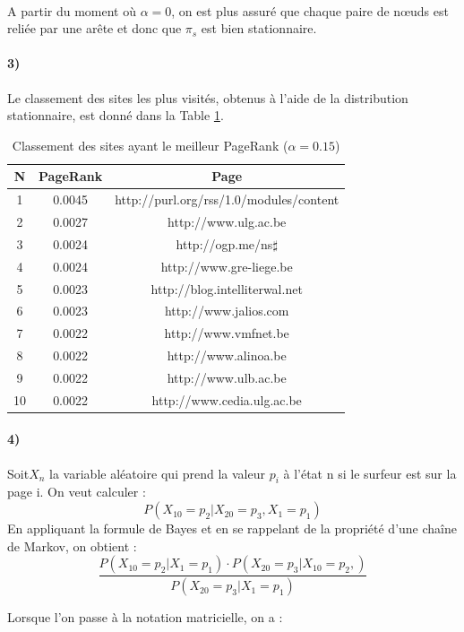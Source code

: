 \documentclass[a4paper,titlepage]{report}
\begin{document}
\paragraph{}
A partir du moment où $\alpha = 0$, on est plus assuré que chaque paire de nœuds est reliée par une arête et donc que $\pi_s$ est bien stationnaire.
\paragraph{3)} 
Le classement des sites les plus visités, obtenus à l'aide de la distribution stationnaire, est donné dans la Table \ref{tab:best_page_rank}.
\begin{table}[h]
	\center
	\begin{tabular}{|c|c|c|}
		\hline
		N\degre & PageRank & Page \\
		\hline
		1 & 0.0045 & http://purl.org/rss/1.0/modules/content \\
		2 & 0.0027 & http://www.ulg.ac.be \\
		3 & 0.0024 & http://ogp.me/ns$\sharp$ \\
		4 & 0.0024 & http://www.gre-liege.be  \\
		5 & 0.0023 & http://blog.intelliterwal.net  \\
		6 & 0.0023 & http://www.jalios.com  \\
		7 & 0.0022 & http://www.vmfnet.be  \\
		8 & 0.0022 & http://www.alinoa.be  \\
		9 & 0.0022 & http://www.ulb.ac.be  \\
		10 & 0.0022 & http://www.cedia.ulg.ac.be  \\
		\hline
	\end{tabular}
	\caption{Classement des sites ayant le meilleur PageRank ($\alpha = 0.15$)}
	\label{tab:best_page_rank}
\end{table}
\paragraph{4)}
Soit$ X_n$ la variable aléatoire qui prend la valeur $p_i$ à l'état n si le surfeur est sur la page i.
On veut calculer : $$
P(X_{10} = p_2 | X_{20} = p_3 , X_1 = p_1)
$$
En appliquant la formule de Bayes et en se rappelant de la propriété d'une chaîne de Markov, on obtient :
$$ \dfrac{P(X_{10} = p_2 | X_1 = p_1) \cdot P(X_{20} = p_3 | X_{10} = p_2,)}{P(X_{20} = p_3 | X_1 = p_1)} $$

Lorsque l'on passe à la notation matricielle, on a :
\end{document}
